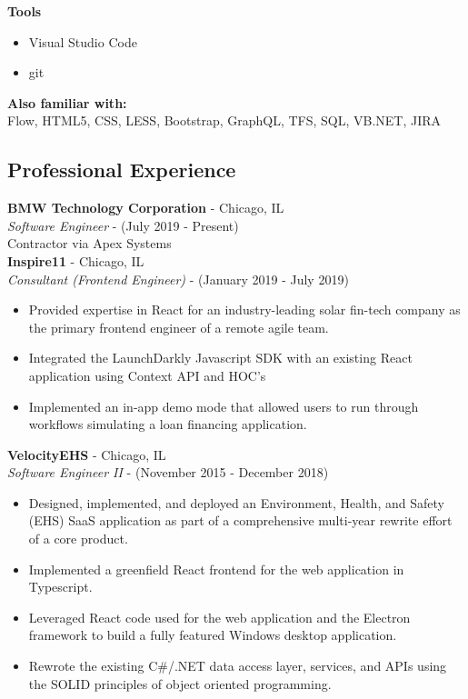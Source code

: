 \documentclass[12pt]{article}
\begin{document}
\begin{paracol}{2}
\noindent \textbf{Tools}
\begin{itemize}
    \item Visual Studio Code
    \item git
\end{itemize}

\noindent \textbf{Also familiar with:}\\
Flow, HTML5, CSS, LESS, Bootstrap, GraphQL, TFS, SQL, VB.NET, JIRA

\switchcolumn 

\subsection*{Professional Experience} 

\textbf{BMW Technology Corporation} - Chicago, IL \\
\textit{Software Engineer} - {\footnotesize{(July 2019 - Present)}} \\
Contractor via Apex Systems \\


\noindent \textbf{Inspire11} - Chicago, IL \\
\textit{Consultant (Frontend Engineer)} - {\footnotesize{(January 2019 - July 2019)}} 
\begin{itemize}[leftmargin=*]
    \setlength\itemsep{0.1em}
    \item{\footnotesize{Provided expertise in React for an industry-leading solar fin-tech company as the primary frontend engineer of a remote agile team.}}
    \item {\footnotesize{Integrated the LaunchDarkly Javascript SDK with an existing React application using Context API and HOC's}}
    \item {\footnotesize{Implemented an in-app demo mode that allowed users to run through workflows simulating a loan financing application.}}
\end{itemize} 

\noindent \textbf{VelocityEHS} - Chicago, IL \\
\textit{Software Engineer II} - {\footnotesize{(November 2015 - December 2018)}}
\begin{itemize}[leftmargin=*]
    \setlength\itemsep{0.1em}
    \item {\footnotesize{Designed, implemented, and deployed an Environment, Health, and Safety (EHS) SaaS application as part of a comprehensive multi-year rewrite effort of a core product.}}
    \item {\footnotesize{Implemented a greenfield React frontend for the web application in Typescript.}}
    \item {\footnotesize{Leveraged React code used for the web application and the Electron framework to build a fully featured Windows desktop application.}}
    \item {\footnotesize{Rewrote the existing C\#/.NET data access layer, services, and APIs using the SOLID principles of object oriented programming.}}
\end{itemize} 


\end{paracol}
\end{document}
